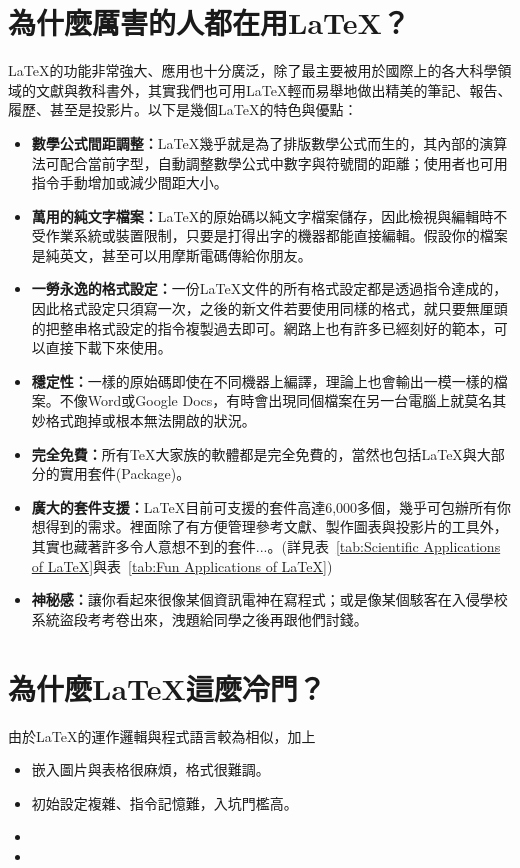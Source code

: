 \documentclass{../indiv}
\begin{document}
	\section{為什麼厲害的人都在用\LaTeX ？}
	\LaTeX 的功能非常強大、應用也十分廣泛，除了最主要被用於國際上的各大科學領域的文獻與教科書外，其實我們也可用\LaTeX 輕而易舉地做出精美的筆記、報告、履歷、甚至是投影片。以下是幾個\LaTeX 的特色與優點：
	\begin{itemize}
		\item \textbf{數學公式間距調整：}\LaTeX 幾乎就是為了排版數學公式而生的，其內部的演算法可配合當前字型，自動調整數學公式中數字與符號間的距離；使用者也可用指令手動增加或減少間距大小。
		\item \textbf{萬用的純文字檔案：}\LaTeX 的原始碼以純文字檔案儲存，因此檢視與編輯時不受作業系統或裝置限制，只要是打得出字的機器都能直接編輯。假設你的檔案是純英文，甚至可以用摩斯電碼傳給你朋友。
		\item \textbf{一勞永逸的格式設定：}一份LaTeX文件的所有格式設定都是透過指令達成的，因此格式設定只須寫一次，之後的新文件若要使用同樣的格式，就只要無厘頭的把整串格式設定的指令複製過去即可。網路上也有許多已經刻好的範本，可以直接下載下來使用。
		\item \textbf{穩定性：}一樣的原始碼即使在不同機器上編譯，理論上也會輸出一模一樣的檔案。不像Word或Google Docs，有時會出現同個檔案在另一台電腦上就莫名其妙格式跑掉或根本無法開啟的狀況。
		\item \textbf{完全免費：}所有\TeX 大家族的軟體都是完全免費的，當然也包括\LaTeX 與大部分的實用套件(Package)。
		\item \textbf{廣大的套件支援：}\LaTeX 目前可支援的套件高達6,000多個，幾乎可包辦所有你想得到的需求。裡面除了有方便管理參考文獻、製作圖表與投影片的工具外，其實也藏著許多令人意想不到的套件...。(詳見表~\ref{tab:Scientific Applications of LaTeX}與表~\ref{tab:Fun Applications of LaTeX})
		\item \textbf{神秘感：}讓你看起來很像某個資訊電神在寫程式；或是像某個駭客在入侵學校系統盜段考考卷出來，洩題給同學之後再跟他們討錢。
	\end{itemize}
	
	\section{為什麼\LaTeX 這麼冷門？}
	由於\LaTeX 的運作邏輯與程式語言較為相似，加上
	\begin{itemize}
		\item 嵌入圖片與表格很麻煩，格式很難調。
		\item 初始設定複雜、指令記憶難，入坑門檻高。
		\item 
		\item 
	\end{itemize}
	
\end{document}
